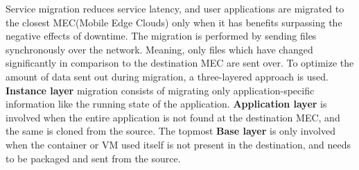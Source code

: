 \documentclass[conference]{IEEEtran}
\begin{document}

Service migration reduces service latency, and user applications are migrated to the closest MEC(Mobile Edge Clouds) only when it has benefits surpassing the negative effects of downtime. The migration is performed by sending files synchronously over the network. Meaning, only files which have changed significantly in comparison to the destination MEC are sent over. To optimize the amount of data sent out during migration, a three-layered approach \cite{migration_mec} is used. \textbf{Instance layer} migration consists of migrating only application-specific information like the running state of the application. \textbf{Application layer} is involved when the entire application is not found at the destination MEC, and the same is cloned from the source. The topmost \textbf{Base layer} is only involved when the container or VM used itself is not present in the destination, and needs to be packaged and sent from the source.

    
    

\end{document}
